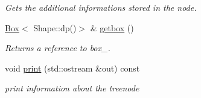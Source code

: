\begin{DoxyCompactItemize}
\begin{DoxyCompactList}\small\item\em Gets the additional informations stored in the node. \item\end{DoxyCompactList}\item 
\hypertarget{classTreeNode_a8a3bcea2abeaa8a19bf3bc67446b33c2}{
\hyperlink{classBox}{Box}$<$ Shape::dp()$>$ \& \hyperlink{classTreeNode_a8a3bcea2abeaa8a19bf3bc67446b33c2}{getbox} ()}
\label{classTreeNode_a8a3bcea2abeaa8a19bf3bc67446b33c2}

\begin{DoxyCompactList}\small\item\em Returns a reference to box\_\-. \item\end{DoxyCompactList}\item 
\hypertarget{classTreeNode_a3406b711c48f59b5ebca45363f4c32c8}{
void \hyperlink{classTreeNode_a3406b711c48f59b5ebca45363f4c32c8}{print} (std::ostream \&out) const }
\label{classTreeNode_a3406b711c48f59b5ebca45363f4c32c8}

\begin{DoxyCompactList}\small\item\em print information about the treenode \item\end{DoxyCompactList}\end{DoxyCompactItemize}
